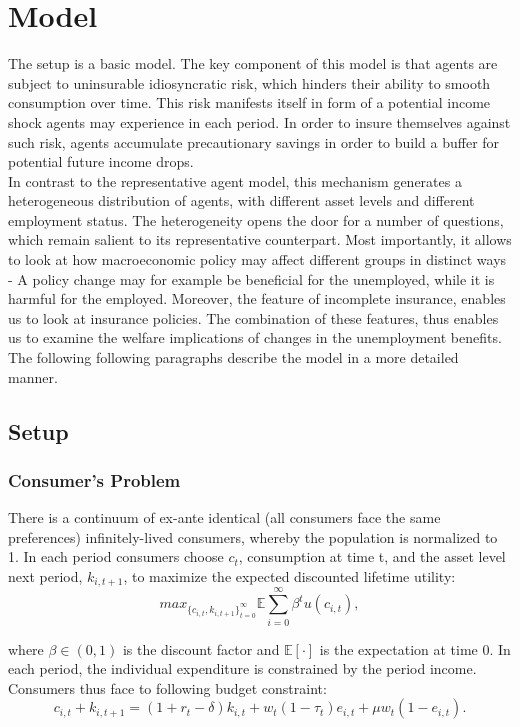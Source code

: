 \documentclass[a4paper,12pt]{article}
\begin{document}
\section{Model}

The setup is a basic \cite{aiyagari} model. The key component of this model is that agents are subject to uninsurable idiosyncratic risk, which hinders their ability to smooth consumption over time. This risk manifests itself in form of a potential income shock agents may experience in each period. In order to insure themselves against such risk, agents accumulate precautionary savings in order to build a buffer for potential future income drops. \\
In contrast to the representative agent model, this mechanism generates a heterogeneous distribution of agents, with different asset levels and different employment status. The heterogeneity opens the door for a number of questions, which remain salient to its representative counterpart. Most importantly, it allows to look at how macroeconomic policy may affect different groups in distinct ways - A policy change may for example be beneficial for the unemployed, while it is harmful for the employed. Moreover, the feature of incomplete insurance, enables us to look at insurance policies. The combination of these features, thus enables us to examine the welfare implications of changes in the unemployment benefits.\\
The following following paragraphs describe the model in a more detailed manner. 


\subsection{Setup}

\subsubsection*{Consumer's Problem}
There is a continuum of ex-ante identical (all consumers face the same preferences) infinitely-lived consumers, whereby the population is normalized to 1. In each period consumers choose $ c_{t}$, consumption at time t, and the asset level next period, $k_{i,t+1}$, to maximize the expected discounted lifetime utility: 
\[ 
 max_{\{{ c_{i,t}, k_{i,t+1} }\}_{t = 0}^{\infty}} {\mathbb{E}} \sum_{i=0}^{\infty} \beta^{t}  u(c_{i,t}), 
 \]

where $\beta \in (0,1)$ is the discount factor and $\mathbb{E[\cdot]}$ is the expectation at time 0. In each period, the individual expenditure is constrained by the period income. Consumers thus face to following budget constraint: 
  \begin{equation}
  \label{eq:budconstraint}
  c_{i,t} + k_{i,t+1} = (1 + r_{t} - \delta) k_{i,t} + w_{t} (1 - \tau_{t})  e_{i,t} + \mu w_{t} (1 - e_{i,t}).
 \end{equation} 
\end{document}
